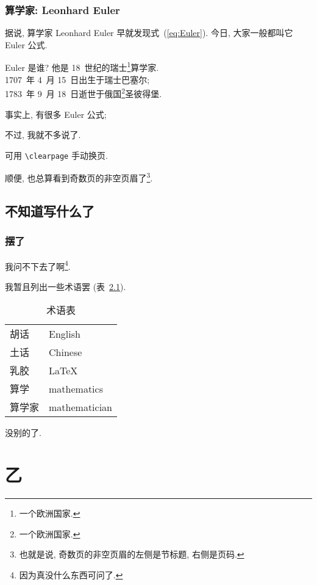 \documentclass[fontset=fandol]{ctexbook}
\begin{document}
\section{算学家: Leonhard Euler}

据说, 算学家 Leonhard Euler 早就发现式~(\ref{eq:Euler}).
今日, 大家一般都叫它 Euler 公式.

Euler 是谁?
他是 18~世纪的瑞士\footnote{一个欧洲国家.}算学家.\\
1707~年 4~月 15~日出生于瑞士巴塞尔;\\
1783~年 9~月 18~日逝世于俄国\footnote{一个欧洲国家.}圣彼得堡.

事实上, 有很多 Euler 公式;\par
不过, 我就不多说了.

\clearpage%

可用 \verb/\clearpage/ 手动换页.

顺便, 也总算看到奇数页的非空页眉了\footnote{也就是说,
    奇数页的非空页眉的左侧是节标题, 右侧是页码.}.

\chapter{不知道写什么了}

\section{摆了}

我问不下去了啊\footnote{因为真没什么东西可问了.}.

我暂且列出一些术语罢 (表~\ref{tab:Terms}).

\begin{table}[h!]
    \centering
    \caption{术语表}\label{tab:Terms}
    \begin{tabular}{l l}
        \hline
        胡话   & English       \\
        土话   & Chinese       \\
        乳胶   & \LaTeX{}      \\
        算学   & mathematics   \\
        算学家 & mathematician \\
        \hline
    \end{tabular}
\end{table}

没别的了.

\part{乙}
\end{document}
